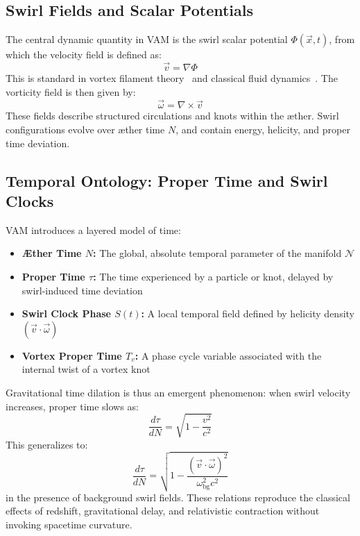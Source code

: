 \documentclass[preprint]{revtex4-2}
\begin{document}
    \subsection{Swirl Fields and Scalar Potentials}
    The central dynamic quantity in VAM is the swirl scalar potential $\Phi(\vec{x},t)$, from which the velocity field is defined as:
    \begin{equation}
        \vec{v} = \nabla \Phi
        \label{eq:velocity_from_potential}
    \end{equation}
    This is standard in vortex filament theory~\cite{saffman1992vortex} and classical fluid dynamics~\cite{batchelor2000introduction}.
    The vorticity field is then given by:
    \begin{equation}
        \vec{\omega} = \nabla \times \vec{v}
        \label{eq:vorticity_definition}
    \end{equation}
    These fields describe structured circulations and knots within the æther. Swirl configurations evolve over æther time $N$, and contain energy, helicity, and proper time deviation.

    \subsection{Temporal Ontology: Proper Time and Swirl Clocks}
    VAM introduces a layered model of time:
    \begin{itemize}
        \item \textbf{Æther Time \boldsymbol\(N\):} The global, absolute temporal parameter of the manifold $\mathcal{N}$
        \item \textbf{Proper Time \boldsymbol\(\tau\):} The time experienced by a particle or knot, delayed by swirl-induced time deviation
        \item \textbf{Swirl Clock Phase \boldsymbol\(S(t)\):} A local temporal field defined by helicity density $(\vec{v} \cdot \vec{\omega})$
        \item \textbf{Vortex Proper Time \boldsymbol\(T_v\):} A phase cycle variable associated with the internal twist of a vortex knot
    \end{itemize}

    Gravitational time dilation is thus an emergent phenomenon: when swirl velocity increases, proper time slows as:
    \begin{equation}
        \frac{d\tau}{dN} = \sqrt{1 - \frac{v^2}{c^2}}
        \label{eq:basic_time_deviation}
    \end{equation}
    This generalizes to:
    \begin{equation}
        \frac{d\tau}{dN} = \sqrt{1 - \frac{(\vec{v} \cdot \vec{\omega})^2}{\omega_{\text{bg}}^2 c^2}}
        \label{eq:helicity_time_deviation}
    \end{equation}
    in the presence of background swirl fields. These relations reproduce the classical effects of redshift, gravitational delay, and relativistic contraction without invoking spacetime curvature.
\end{document}
